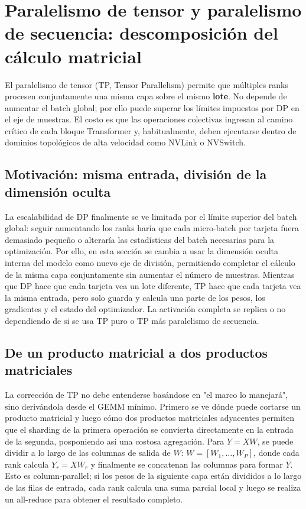 \section{Paralelismo de tensor y paralelismo de secuencia: descomposición del cálculo matricial}

El paralelismo de tensor (TP, Tensor Parallelism) permite que múltiples ranks procesen conjuntamente una misma capa sobre el mismo \textbf{lote}. No depende de aumentar el batch global; por ello puede superar los límites impuestos por DP en el eje de muestras. El costo es que las operaciones colectivas ingresan al camino crítico de cada bloque Transformer y, habitualmente, deben ejecutarse dentro de dominios topológicos de alta velocidad como NVLink o NVSwitch.

\subsection{Motivación: misma entrada, división de la dimensión oculta}

La escalabilidad de DP finalmente se ve limitada por el límite superior del batch global: seguir aumentando los ranks haría que cada micro-batch por tarjeta fuera demasiado pequeño o alteraría las estadísticas del batch necesarias para la optimización. Por ello, en esta sección se cambia a usar la dimensión oculta interna del modelo como nuevo eje de división, permitiendo completar el cálculo de la misma capa conjuntamente sin aumentar el número de muestras. Mientras que DP hace que cada tarjeta vea un lote diferente, TP hace que cada tarjeta vea la misma entrada, pero solo guarda y calcula una parte de los pesos, los gradientes y el estado del optimizador. La activación completa se replica o no dependiendo de si se usa TP puro o TP más paralelismo de secuencia.


\subsection{De un producto matricial a dos productos matriciales}

La corrección de TP no debe entenderse basándose en "el marco lo manejará", sino derivándola desde el GEMM mínimo. Primero se ve dónde puede cortarse un producto matricial y luego cómo dos productos matriciales adyacentes permiten que el sharding de la primera operación se convierta directamente en la entrada de la segunda, posponiendo así una costosa agregación. Para $Y=XW$, se puede dividir a lo largo de las columnas de salida de $W$: $W=[W_1,\ldots,W_P]$, donde cada rank calcula $Y_r=XW_r$ y finalmente se concatenan las columnas para formar $Y$. Esto es column-parallel; si los pesos de la siguiente capa están divididos a lo largo de las filas de entrada, cada rank calcula una suma parcial local y luego se realiza un all-reduce para obtener el resultado completo.

